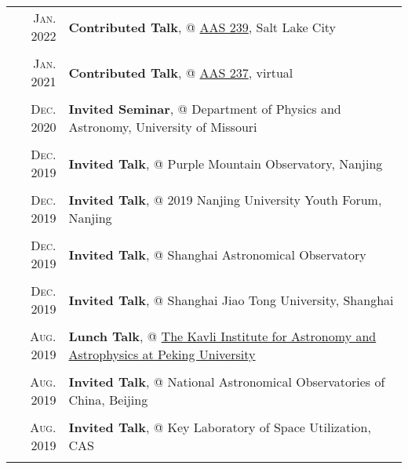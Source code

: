 \documentclass[letterpaper,10pt]{article}
\newcommand{\textwrap}{5.8in}       %
\begin{document}
\begingroup
\renewcommand\arraystretch{0.3}
\vspace*{-.5em}
\begin{longtable}{r|p{\textwrap}}

    \textsc{Jan. 2022}   &   \textbf{Contributed Talk}, @ \href{https://aas.org/meetings/aas239}{AAS 239}, Salt Lake City\\
    \multicolumn{2}{c}{} \\

    \textsc{Jan. 2021}   &   \textbf{Contributed Talk}, @ \href{https://aas.org/meetings/aas237}{AAS 237}, virtual    \\
    \multicolumn{2}{c}{} \\

    \textsc{Dec. 2020}   &   \textbf{Invited Seminar}, @ Department of Physics and Astronomy, University of Missouri \\
    \multicolumn{2}{c}{} \\

    \textsc{Dec. 2019}   &   \textbf{Invited Talk}, @ Purple Mountain Observatory, Nanjing \\
    \multicolumn{2}{c}{} \\

    \textsc{Dec. 2019}   &   \textbf{Invited Talk}, @ 2019 Nanjing University Youth Forum, Nanjing \\
    \multicolumn{2}{c}{} \\

    \textsc{Dec. 2019}   &   \textbf{Invited Talk}, @ Shanghai Astronomical Observatory \\
    \multicolumn{2}{c}{} \\

    \textsc{Dec. 2019}   &   \textbf{Invited Talk}, @ Shanghai Jiao Tong University, Shanghai \\
    \multicolumn{2}{c}{} \\

    \textsc{Aug. 2019}   &   \textbf{Lunch Talk}, @ \href{http://kiaa.pku.edu.cn/info/1025/5076.htm}{The Kavli Institute for 
    Astronomy and Astrophysics at Peking University} \\
    \multicolumn{2}{c}{} \\

    \textsc{Aug. 2019}   &   \textbf{Invited Talk}, @ National Astronomical Observatories of China, Beijing \\
    \multicolumn{2}{c}{} \\

    \textsc{Aug. 2019}   &   \textbf{Invited Talk}, @ Key Laboratory of Space Utilization, CAS \\
    \multicolumn{2}{c}{} \\


\end{longtable}
\end{document}
